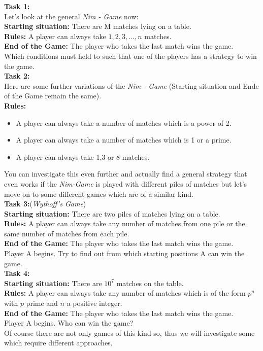 \documentclass[11pt,a5paper]{article}
\begin{document}
\noindent
\textbf{Task 1:}\\
\noindent
Let's look at the general \emph{ Nim - Game} now:\\
\textbf{Starting situation:} There are M matches lying on a table.\\
\textbf{Rules:} A player can always take $1,2,3,...,n$  matches.\\
\textbf{End of the Game:} The player who takes the last match wins the game.\\
Which conditions must held to such that one of the players has a strategy to win the game.\\

\noindent
\textbf{Task 2:}\\
\noindent
Here are some further variations of the \emph{Nim - Game} (Starting situation and Ende of the Game remain the same).\\
\textbf{Rules:}\\[-0.5cm]
\begin{itemize}
\item{A player can always take a number of matches which is a power of 2.}
\item{A player can always take  a number of matches which is 1 or a prime.}
\item{A player can always take 1,3 or 8 matches.}
\end{itemize}
You can investigate this even further and actually find a general strategy that even works if the \emph{Nim-Game} is played with different piles of matches but let's move on to some different games which are of a similar kind.\\

\noindent
\textbf{Task 3:}(\emph{Wythoff's Game})\\
\noindent
\textbf{Starting situation:} There are two piles of  matches lying on a table.\\
\textbf{Rules:} A player can always take any number of matches from one pile or the same number of matches from each pile.\\
\textbf{End of the Game:} The player who takes the last match wins the game.\\
\noindent
Player A begins. Try to find out from which starting positions A can win the game.\\

\noindent
\textbf{Task 4:}\\
\noindent
\textbf{Starting situation:} There are $10^7$ matches on the table.\\
\textbf{Rules:} A player can always take any number of matches which is of the form $p^n$ with $p$ prime and $n$ a positive integer.\\
\textbf{End of the Game:} The player who takes the last match wins the game.\\
\noindent
Player A begins. Who can win the game?\\
Of course there are not only games of this kind so, thus we will investigate some which require different approaches.\\
\end{document}
